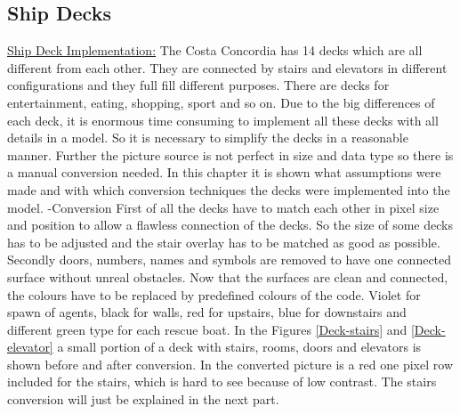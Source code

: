 \documentclass[11pt]{article}
\begin{document}
\subsection{Ship Decks}

\underline{Ship Deck Implementation:}
\newline
The Costa Concordia has 14 decks which are all different from each other. They are connected by stairs and elevators in different configurations and they full fill different purposes. There are decks for entertainment, eating, shopping, sport and so on.
Due to the big differences of each deck, it is enormous time consuming to implement all these decks with all details in a model. So it is necessary to simplify the decks in a reasonable manner.
Further the picture source is not perfect in size and data type so there is a manual conversion needed.
In this chapter it is shown what assumptions were made and with which conversion techniques the decks were implemented into the model.
\newline
-Conversion
\newline
First of all the decks have to match each other in pixel size and position to allow a flawless connection of the decks. So the size of some decks has to be adjusted and the stair overlay has to be matched as good as possible.
Secondly doors, numbers, names and symbols are removed to have one connected surface without unreal obstacles.
\newline
Now that the surfaces are clean and connected, the colours have to be replaced by predefined colours of the code. Violet for spawn of agents, black for walls, red for upstairs, blue for downstairs and different green type for each rescue boat.
\newline
In the Figures \ref{Deck-stairs} and \ref{Deck-elevator} a small portion of a deck with stairs, rooms, doors and elevators is shown before and after conversion. In the converted picture is a red one pixel row included for the stairs, which is hard to see because of low contrast. The stairs conversion will just be explained in the next part.
\end{document}
